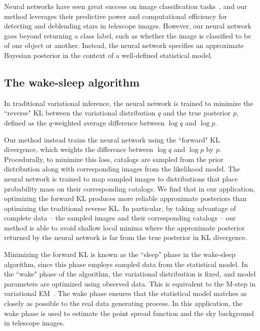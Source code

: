Neural networks have seen great success on image classification tasks~\cite{imagenet2015}, and our method leverages their predictive power and computational efficiency for detecting and deblending stars in telescope images.
However, our neural network goes beyond returning a class label, such as whether the image is classified to be of one object or another. 
Instead, the neural network specifies an approximate Bayesian posterior in the context of a well-defined statistical model. 

\subsection{The wake-sleep algorithm}

In traditional variational inference, the neural network is trained to minimize the ``reverse" KL between the variational distribution $q$ and the true posterior $p$, defined as the $q$-weighted average difference between $\log q$ and $\log p$. 

Our method instead trains the neural network using the ``forward" KL divergence, which weights the difference between $\log q$ and $\log p$ by $p$. Procedurally, to minimize this loss, catalogs are sampled from the prior distribution along with corresponding images from the likelihood model. 
The neural network is trained to map sampled images to distributions that place probability mass on their corresponding catalogs. 
We find that in our application, optimizing the forward KL produces more reliable approximate posteriors than optimizing the traditional reverse KL. 
In particular, by taking advantage of complete data -- the sampled images and their corresponding catalogs -- our method is able to avoid shallow local minima where the approximate posterior returned by the neural network is far from the true posterior in KL divergence. 

Minimizing the forward KL is known as the ``sleep" phase in the wake-sleep algorithm, since this phase employs sampled data from the statistical model. 
In the ``wake" phase of the algorithm, the variational distribution is fixed, and model parameters are optimized using observed data. 
This is equivalent to the M-step in variational EM~\cite{Jordan_intro_vi, neal2000varem, Beal2002varem}.
The wake phase ensures that the statistical model matches as closely as possible to the real data generating process. 
In this application, the wake phase is used to estimate the point spread function and the sky background in telescope images. 

